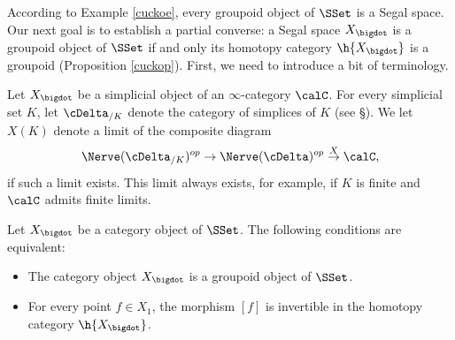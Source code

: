 According to Example \ref{cuckoe}, every groupoid object of $\SSet$ is a Segal space.
Our next goal is to establish a partial converse: a Segal space $X_{\bigdot}$ is a groupoid object
of $\SSet$ if and only its homotopy category $\h{X_{\bigdot}}$ is a groupoid (Proposition \ref{cuckop}).
First, we need to introduce a bit of terminology. 

\begin{notation}
Let $X_{\bigdot}$ be a simplicial object of an $\infty$-category $\calC$. For every simplicial set
$K$, let $\cDelta_{/K}$ denote the category of simplices of $K$ (see \S {}). We
let $X(K)$ denote a limit of the composite diagram
$$ \Nerve( \cDelta_{/K})^{op} \rightarrow \Nerve( \cDelta)^{op} \stackrel{X}{\rightarrow} \calC,$$
if such a limit exists. This limit always exists, for example, if $K$ is finite and $\calC$ admits finite limits.
\end{notation}

\begin{proposition}\label{cuckop}
Let $X_{\bigdot}$ be a category object of $\SSet$. The following conditions are equivalent:
\begin{itemize}
\item[$(1)$] The category object $X_{\bigdot}$ is a groupoid object of $\SSet$.
\item[$(2)$] For every point $f \in X_1$, the morphism $[f]$ is invertible in the homotopy category $\h{X_{\bigdot}}$.
\end{itemize}
\end{proposition}

